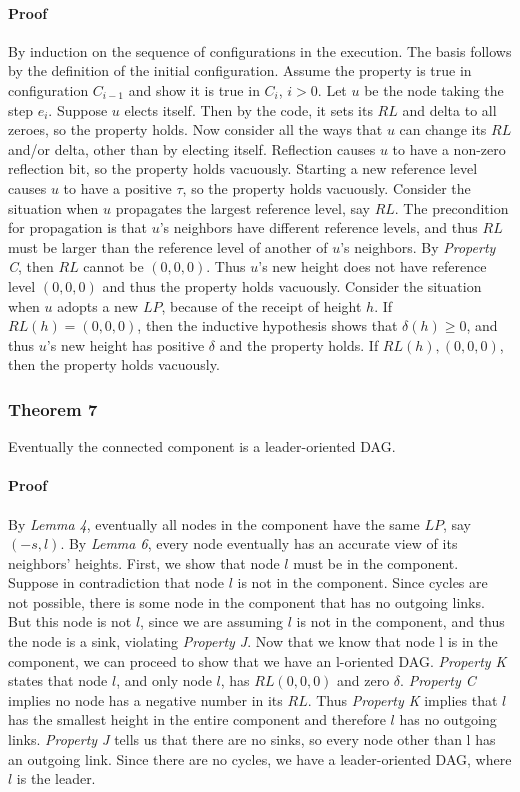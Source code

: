 \documentclass{article}
\begin{document}
\paragraph{Proof}
By induction on the sequence of configurations in the execution. The basis follows by the definition of the initial configuration. Assume the property is true in configuration $C_{i − 1}$ and show it is true in $C_i$, $i > 0$. Let $u$ be the node taking the step $e_i$. Suppose $u$ elects itself. Then by the code, it sets its $RL$ and delta to all zeroes, so the property holds. Now consider all the ways that $u$ can change its $RL$ and/or delta, other than by electing itself. Reflection causes $u$ to have a non-zero reflection bit, so the property holds vacuously. Starting a new reference level causes $u$ to have a positive $\tau $, so the property holds vacuously. Consider the situation when $u$ propagates the largest reference level, say $RL$. The precondition for propagation is that $u$’s neighbors have different reference levels, and thus $RL$ must be larger than the reference level of another of $u$’s neighbors. By \textit{Property C}, then $RL$ cannot be $(0,0,0)$. Thus
$u$’s new height does not have reference level $(0,0,0)$ and thus the property holds vacuously.
Consider the situation when $u$ adopts a new $LP$, because of the receipt of height $h$. If $RL(h) = (0, 0, 0)$, then the inductive hypothesis shows that $\delta (h) \geq 0$, and thus $u$’s new height has positive $\delta $ and the property holds. If $RL(h), (0, 0, 0)$, then the property holds vacuously.


\subsubsection{Theorem 7}
Eventually the connected component is a leader-oriented DAG.

\paragraph{Proof}
By \textit{Lemma 4}, eventually all nodes in the component have the same $LP$, say $(−s, l)$. By \textit{Lemma 6}, every node eventually has an accurate view of its neighbors’ heights. First, we show that node $l$ must be in the component. Suppose in contradiction that node $l$ is not in the component. Since cycles are not possible, there is some node in the component that has no outgoing links. But this node is not $l$, since we are assuming $l$ is not in the component, and thus the node is a sink, violating \textit{Property J}.
Now that we know that node l is in the component, we can proceed to show that we have an l-oriented DAG. \textit{Property K} states that node $l$, and only node $l$, has $RL(0,0,0)$ and zero $\delta $. \textit{Property C} implies no node has a negative number in its $RL$. Thus \textit{Property K} implies that $l$ has the smallest height in the entire component and therefore $l$ has no outgoing links. \textit{Property J} tells us that there are no sinks, so every node other than l has an outgoing link. Since there are no cycles, we have a leader-oriented DAG, where $l$ is the leader.
\end{document}
